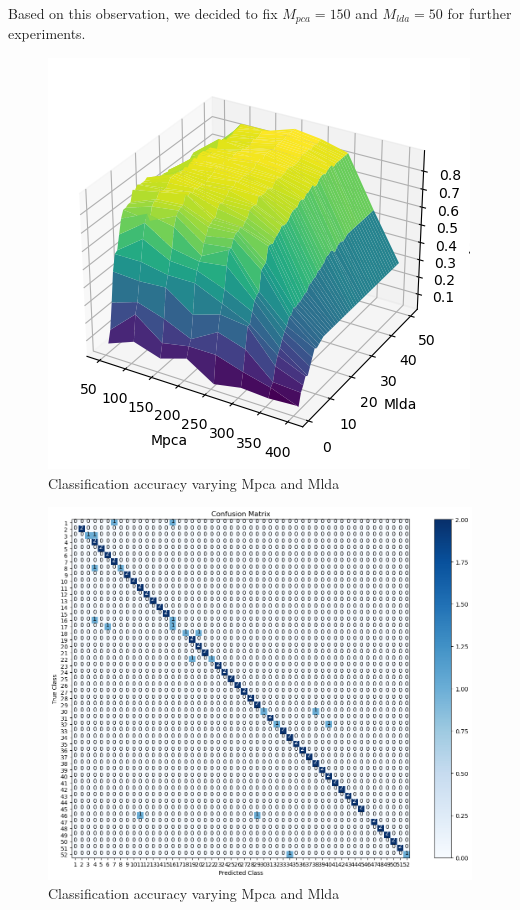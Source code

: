 Based on this observation, we decided to fix $M_{pca}=150$ and $M_{lda}=50$ for further experiments. 

\begin{figure}[t]
  \centering
   \includegraphics[width=0.8\linewidth]{image/mpca_mlda.png}

   \caption{Classification accuracy varying Mpca and Mlda}
   \label{fig:mpca_mlda}
\end{figure}

\begin{figure}[t]
  \centering
   \includegraphics[width=0.8\linewidth]{image/q3_1_cm.png} %

   \caption{Classification accuracy varying Mpca and Mlda}
   \label{fig:q3_1_cm}
\end{figure}

